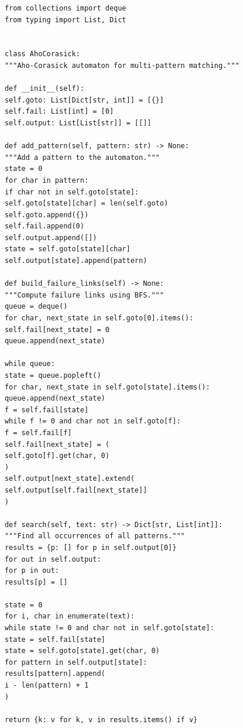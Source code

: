 \documentclass{matinbook}
\begin{document}
    \begin{latin}
        \begin{verbatim}
            from collections import deque
            from typing import List, Dict
            
            
            class AhoCorasick:
            """Aho-Corasick automaton for multi-pattern matching."""
            
            def __init__(self):
            self.goto: List[Dict[str, int]] = [{}]
            self.fail: List[int] = [0]
            self.output: List[List[str]] = [[]]
            
            def add_pattern(self, pattern: str) -> None:
            """Add a pattern to the automaton."""
            state = 0
            for char in pattern:
            if char not in self.goto[state]:
            self.goto[state][char] = len(self.goto)
            self.goto.append({})
            self.fail.append(0)
            self.output.append([])
            state = self.goto[state][char]
            self.output[state].append(pattern)
            
            def build_failure_links(self) -> None:
            """Compute failure links using BFS."""
            queue = deque()
            for char, next_state in self.goto[0].items():
            self.fail[next_state] = 0
            queue.append(next_state)
            
            while queue:
            state = queue.popleft()
            for char, next_state in self.goto[state].items():
            queue.append(next_state)
            f = self.fail[state]
            while f != 0 and char not in self.goto[f]:
            f = self.fail[f]
            self.fail[next_state] = (
            self.goto[f].get(char, 0)
            )
            self.output[next_state].extend(
            self.output[self.fail[next_state]]
            )
            
            def search(self, text: str) -> Dict[str, List[int]]:
            """Find all occurrences of all patterns."""
            results = {p: [] for p in self.output[0]}
            for out in self.output:
            for p in out:
            results[p] = []
            
            state = 0
            for i, char in enumerate(text):
            while state != 0 and char not in self.goto[state]:
            state = self.fail[state]
            state = self.goto[state].get(char, 0)
            for pattern in self.output[state]:
            results[pattern].append(
            i - len(pattern) + 1
            )
            
            return {k: v for k, v in results.items() if v}
        \end{verbatim}
    \end{latin}
    \label{code:aho-corasick}
    
\end{document}
